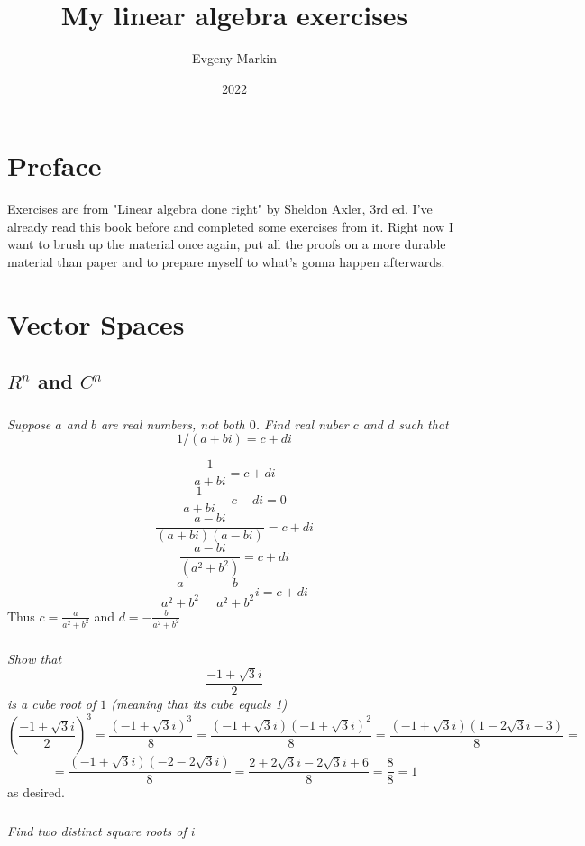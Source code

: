 \documentclass[10pt,oneside,titlepage]{book}
\title{My linear algebra exercises}
\author{Evgeny Markin}
\date{2022}
\begin{document}
\maketitle
\tableofcontents

\chapter*{Preface}

Exercises are from "Linear algebra done right" by Sheldon Axler, 3rd ed.
I've already read this book before and completed some exercises from it.
Right now I want to brush up the material once again, put all the
proofs on a more durable material than paper and to prepare myself to
what's gonna happen afterwards.

\chapter{Vector Spaces}
\section{$R^n$ and $C^n$}

\subsection{}
\textit{Suppose $a$ and $b$ are real numbers, not both $0$. Find real nuber
  $c$ and $d$ such that }
$$1/(a + bi) = c + di$$

$$\frac{1}{a + bi} = c + di$$
$$\frac{1}{a + bi} - c - di = 0$$
$$\frac{a - bi}{(a + bi)(a - bi)} = c + di$$
$$\frac{a - bi}{(a^2 + b^2)} = c + di$$
$$\frac{a}{a^2 + b^2} - \frac{b}{a^2 + b^2}i = c + di$$
Thus $c = \frac{a}{a^2 + b^2}$ and $d = -\frac{b}{a^2 + b^2}$

\subsection{}
\textit{Show that }
$$\frac{-1  + \sqrt{3}i}{2}$$
\textit{is a cube root of $1$ (meaning that its cube equals 1)}
$$(\frac{-1  + \sqrt{3}i}{2})^3 =
\frac{(-1  + \sqrt{3}i)^3}{8} =
\frac{(-1  + \sqrt{3}i)(-1  + \sqrt{3}i)^2}{8} =
\frac{(-1  + \sqrt{3}i)(1  - 2\sqrt{3}i - 3)}{8} =
$$
$$
=\frac{(-1  + \sqrt{3}i)(-2  - 2\sqrt{3}i)}{8} =
\frac{2 + 2\sqrt{3}i - 2\sqrt{3}i + 6}{8} =
\frac{8}{8} = 1
$$
as desired.

\subsection{}
\textit{Find two distinct square roots of $i$}
\end{document}

